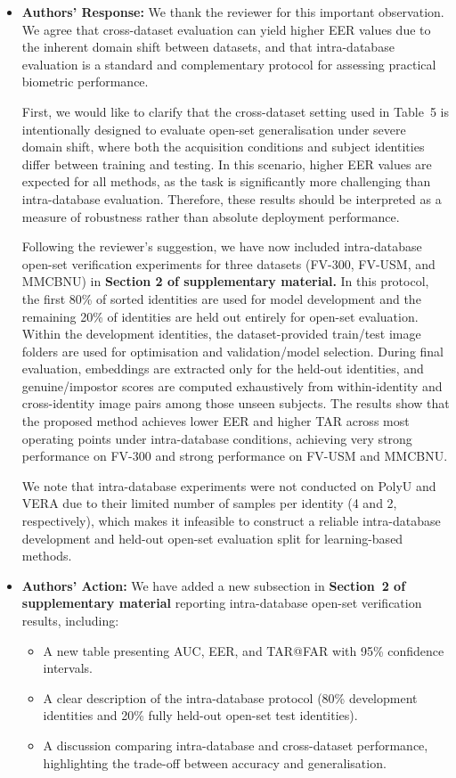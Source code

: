 \documentclass[11pt]{article}
\theoremstyle{remark}
\begin{document}
\begin{itemize}
	\item \textbf{Authors' Response:} 
	We thank the reviewer for this important observation. We agree that cross-dataset evaluation can yield higher EER values due to the inherent domain shift between datasets, and that intra-database evaluation is a standard and complementary protocol for assessing practical biometric performance.

	First, we would like to clarify that the cross-dataset setting used in Table~5 is intentionally designed to evaluate {open-set generalisation under severe domain shift}, where both the acquisition conditions and subject identities differ between training and testing. In this scenario, higher EER values are expected for all methods, as the task is significantly more challenging than intra-database evaluation. Therefore, these results should be interpreted as a measure of robustness rather than absolute deployment performance.

	Following the reviewer’s suggestion, we have now included {intra-database open-set verification experiments} for three datasets (FV-300, FV-USM, and MMCBNU) in \textbf{Section 2 of supplementary material.} In this protocol, the first 80\% of sorted identities are used for model development and the remaining 20\% of identities are held out entirely for open-set evaluation. Within the development identities, the dataset-provided train/test image folders are used for optimisation and validation/model selection. During final evaluation, embeddings are extracted only for the held-out identities, and genuine/impostor scores are computed exhaustively from within-identity and cross-identity image pairs among those unseen subjects. The results show that the proposed method achieves lower EER and higher TAR across most operating points under intra-database conditions, achieving very strong performance on FV-300 and strong performance on FV-USM and MMCBNU.
    

	We note that intra-database experiments were not conducted on PolyU and VERA due to their limited number of samples per identity (4 and 2, respectively), which makes it infeasible to construct a reliable intra-database development and held-out open-set evaluation split for learning-based methods.

	\item \textbf{Authors' Action:} 
	We have added a new subsection in \textbf{Section~2 of supplementary material} reporting {intra-database open-set verification results}, including:
	\begin{itemize}
	    \item A new table presenting AUC, EER, and TAR@FAR with 95\% confidence intervals.
	    \item A clear description of the intra-database protocol (80\% development identities and 20\% fully held-out open-set test identities).
	    \item A discussion comparing intra-database and cross-dataset performance, highlighting the trade-off between accuracy and generalisation.
	\end{itemize}


\end{itemize}
\end{document}
